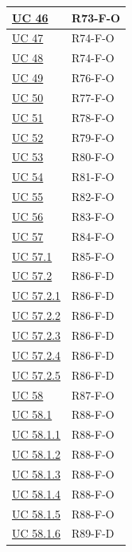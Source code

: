{\begin{longtable}{|>{\raggedright\arraybackslash}p{3.0cm}|>{\raggedright\arraybackslash}p{12.6cm}|}
    \hyperref[uc:46]{UC 46} & \mbox{R73-F-O} \\ \hline
    \hyperref[uc:47]{UC 47} & \mbox{R74-F-O} \\ \hline
    \hyperref[uc:48]{UC 48} & \mbox{R74-F-O} \\ \hline
    \hyperref[uc:49]{UC 49} & \mbox{R76-F-O} \\ \hline
    \hyperref[uc:50]{UC 50} & \mbox{R77-F-O} \\ \hline
    \hyperref[uc:51]{UC 51} & \mbox{R78-F-O} \\ \hline
    \hyperref[uc:52]{UC 52} & \mbox{R79-F-O} \\ \hline
    \hyperref[uc:53]{UC 53} & \mbox{R80-F-O} \\ \hline
    \hyperref[uc:54]{UC 54} & \mbox{R81-F-O} \\ \hline
    \hyperref[uc:55]{UC 55} & \mbox{R82-F-O} \\ \hline
    \hyperref[uc:56]{UC 56} & \mbox{R83-F-O} \\ \hline
    \hyperref[uc:57]{UC 57} & \mbox{R84-F-O} \\ \hline
    \hyperref[uc:57.1]{UC 57.1} & \mbox{R85-F-O} \\ \hline
    \hyperref[uc:57.2]{UC 57.2} & \mbox{R86-F-D} \\ \hline
    \hyperref[uc:57.2.1]{UC 57.2.1} & \mbox{R86-F-D} \\ \hline
    \hyperref[uc:57.2.2]{UC 57.2.2} & \mbox{R86-F-D} \\ \hline
    \hyperref[uc:57.2.3]{UC 57.2.3} & \mbox{R86-F-D} \\ \hline
    \hyperref[uc:57.2.4]{UC 57.2.4} & \mbox{R86-F-D} \\ \hline
    \hyperref[uc:57.2.5]{UC 57.2.5} & \mbox{R86-F-D} \\ \hline
    \hyperref[uc:58]{UC 58} & \mbox{R87-F-O} \\ \hline
    \hyperref[uc:58.1]{UC 58.1} & \mbox{R88-F-O} \\ \hline
    \hyperref[uc:58.1.1]{UC 58.1.1} & \mbox{R88-F-O} \\ \hline
    \hyperref[uc:58.1.2]{UC 58.1.2} & \mbox{R88-F-O} \\ \hline
    \hyperref[uc:58.1.3]{UC 58.1.3} & \mbox{R88-F-O} \\ \hline
    \hyperref[uc:58.1.4]{UC 58.1.4} & \mbox{R88-F-O} \\ \hline
    \hyperref[uc:58.1.5]{UC 58.1.5} & \mbox{R88-F-O} \\ \hline
    \hyperref[uc:58.1.6]{UC 58.1.6} & \mbox{R89-F-D} \\ \hline

\end{longtable}}
